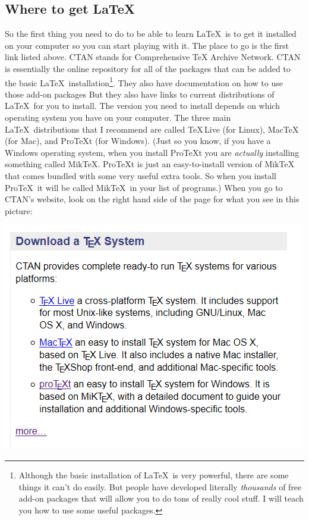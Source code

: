 \documentclass[11pt]{article}
\begin{document}
\subsection{Where to get \LaTeX}
So the first thing you need to do to be able to learn \LaTeX\ is to get it installed on your computer so you can start playing with it. The place to go is the first link listed above.  CTAN stands for Comprehensive TeX Archive Network.  CTAN is essentially the online repository for all of the packages that can be added to the basic \LaTeX\ installation\footnote{Although the basic installation of \LaTeX\ is very powerful, there are some things it can't do easily.  But people have developed literally \emph{thousands} of free add-on packages that will allow you to do tons of really cool stuff.  I will teach you how to use some useful packages.}.  They also have documentation on how to use those add-on packages  But they also have links to current distributions of \LaTeX\ for you to install.  The version you need to install depends on which operating system you have on your computer.  The three main \LaTeX\ distributions that I recommend are called \TeX\,Live (for Linux), Mac\TeX\, (for Mac), and Pro\TeX t (for Windows). (Just so you know, if you have a Windows operating system, when you install Pro\TeX t you are \emph{actually} installing something called Mik\TeX. Pro\TeX t is just an easy-to-install version of Mik\TeX\, that comes bundled with some very useful extra tools.  So when you install Pro\TeX\, it will be called Mik\TeX\, in your list of programs.)  When you go to CTAN's website, look on the right hand side of the page for what you see in this picture:\\
\begin{center}
\includegraphics[width=.6\columnwidth]{Capture}
\end{center}
\end{document}
